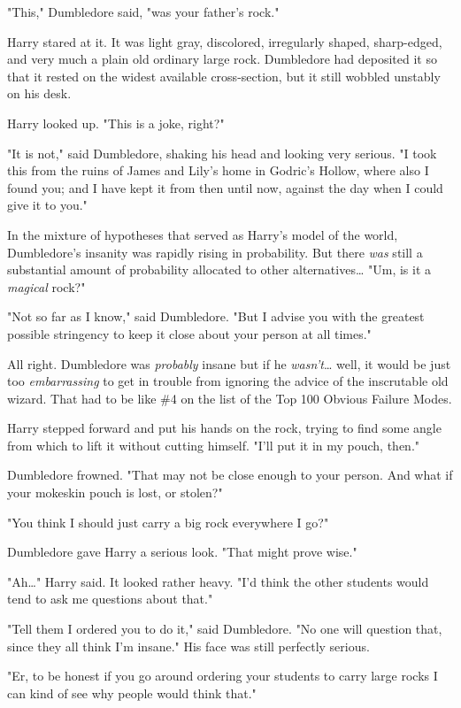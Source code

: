 "This," Dumbledore said, "was your father's rock."

Harry stared at it. It was light gray, discolored, irregularly shaped,
sharp-edged, and very much a plain old ordinary large rock. Dumbledore had
deposited it so that it rested on the widest available cross-section, but it
still wobbled unstably on his desk.

Harry looked up. "This is a joke, right?"

"It is not," said Dumbledore, shaking his head and looking very serious. "I
took this from the ruins of James and Lily's home in Godric's Hollow, where
also I found you; and I have kept it from then until now, against the day when
I could give it to you."

In the mixture of hypotheses that served as Harry's model of the world,
Dumbledore's insanity was rapidly rising in probability. But there \emph{was}
still a substantial amount of probability allocated to other
alternatives{\ldots} "Um, is it a \emph{magical} rock?"

"Not so far as I know," said Dumbledore. "But I advise you with the greatest
possible stringency to keep it close about your person at all times."

All right. Dumbledore was \emph{probably} insane but if he
\emph{wasn't}{\ldots} well, it would be just too \emph{embarrassing} to get in
trouble from ignoring the advice of the inscrutable old wizard. That had to be
like \#4 on the list of the Top 100 Obvious Failure Modes.

Harry stepped forward and put his hands on the rock, trying to find some angle
from which to lift it without cutting himself. "I'll put it in my pouch, then."

Dumbledore frowned. "That may not be close enough to your person. And what if
your mokeskin pouch is lost, or stolen?"

"You think I should just carry a big rock everywhere I go?"

Dumbledore gave Harry a serious look. "That might prove wise."

"Ah{\ldots}" Harry said. It looked rather heavy. "I'd think the other students
would tend to ask me questions about that."

"Tell them I ordered you to do it," said Dumbledore. "No one will question
that, since they all think I'm insane." His face was still perfectly serious.

"Er, to be honest if you go around ordering your students to carry large rocks
I can kind of see why people would think that."

